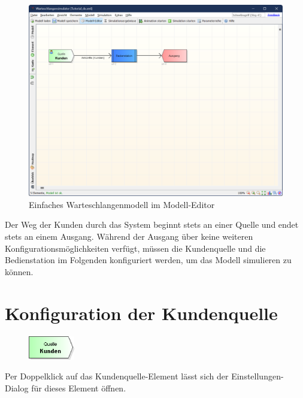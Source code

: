 \documentclass[deutsch]{svmono}
\begin{document}
\begin{figure}[H]	
	\caption{Einfaches Warteschlangenmodell im Modell-Editor}
	\centerline{\includegraphics[width=14cm]{ProgramWindowModel.png}}
	\label{fig:ProgramWindowModel}
\end{figure}

Der Weg der Kunden durch das System beginnt stets an einer Quelle und endet stets an einem Ausgang. Während der Ausgang über keine weiteren Konfigurationsmöglichkeiten verfügt, müssen die Kundenquelle und die Bedienstation im Folgenden konfiguriert werden, um das Modell simulieren zu können.

\section{Konfiguration der Kundenquelle}

\begin{figure}
\vspace{-22pt}
\includegraphics[width=2cm]{IconSource.png}
\vspace{-22pt}
\end{figure}
Per Doppelklick auf das Kundenquelle-Element lässt sich der Einstellungen-Dialog für dieses Element öffnen.
\end{document}
